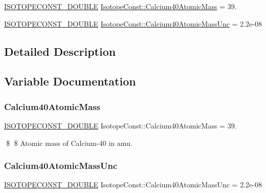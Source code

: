 \begin{DoxyCompactItemize}
\item 
\mbox{\hyperlink{group___isotope_const-_macros_ga8f45a7272ce02c0b4c65c44636ed719a}{I\+S\+O\+T\+O\+P\+E\+C\+O\+N\+S\+T\+\_\+\+D\+O\+U\+B\+LE}} \mbox{\hyperlink{group___isotope_const-_calcium-_ca40_ga9075f55037624dba425c5096abd7678a}{Isotope\+Const\+::\+Calcium40\+Atomic\+Mass}} = 39.
\item 
\mbox{\hyperlink{group___isotope_const-_macros_ga8f45a7272ce02c0b4c65c44636ed719a}{I\+S\+O\+T\+O\+P\+E\+C\+O\+N\+S\+T\+\_\+\+D\+O\+U\+B\+LE}} \mbox{\hyperlink{group___isotope_const-_calcium-_ca40_ga26ca9382df19e5343a75950d9f069398}{Isotope\+Const\+::\+Calcium40\+Atomic\+Mass\+Unc}} = 2.\+2e-\/08
\end{DoxyCompactItemize}


\subsection{Detailed Description}


\subsection{Variable Documentation}
\mbox{\label{group___isotope_const-_calcium-_ca40_ga9075f55037624dba425c5096abd7678a}} 
\subsubsection{\texorpdfstring{Calcium40\+Atomic\+Mass}{Calcium40AtomicMass}}
{\footnotesize\ttfamily \mbox{\hyperlink{group___isotope_const-_macros_ga8f45a7272ce02c0b4c65c44636ed719a}{I\+S\+O\+T\+O\+P\+E\+C\+O\+N\+S\+T\+\_\+\+D\+O\+U\+B\+LE}} Isotope\+Const\+::\+Calcium40\+Atomic\+Mass = 39.}

\$ \$ Atomic mass of Calcium-\/40 in amu. \mbox{\label{group___isotope_const-_calcium-_ca40_ga26ca9382df19e5343a75950d9f069398}} 
\subsubsection{\texorpdfstring{Calcium40\+Atomic\+Mass\+Unc}{Calcium40AtomicMassUnc}}
{\footnotesize\ttfamily \mbox{\hyperlink{group___isotope_const-_macros_ga8f45a7272ce02c0b4c65c44636ed719a}{I\+S\+O\+T\+O\+P\+E\+C\+O\+N\+S\+T\+\_\+\+D\+O\+U\+B\+LE}} Isotope\+Const\+::\+Calcium40\+Atomic\+Mass\+Unc = 2.\+2e-\/08}

